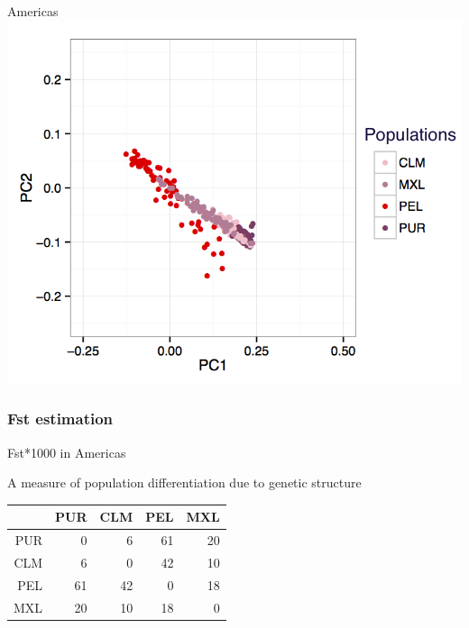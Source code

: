\documentclass[11pt,xcolor=table]{beamer}
\begin{document}
\begin{frame}{Americas}
\centering
\includegraphics[width=.85\textwidth]{pics/pel-AMR.png}
\end{frame}

\subsubsection{Fst estimation}
\begin{frame}{Fst*1000 in Americas}
\begin{block}{A measure of population differentiation due to genetic structure}
\end{block}
\begin{table}[]
\centering
\begin{tabular}{|r||r|r|r|r|}
\hline
    &PUR    &    CLM    &    PEL&        MXL \\ \hline
PUR&      0   &  6    &61  &  20 \\ \hline
CLM &     6  &   0    &42  &  10 \\ \hline
PEL  &   61 &   42    & 0 &   18 \\ \hline
MXL   &  20&    10    &18&     0 \\ \hline
\end{tabular}
\end{table}
\end{frame}
\end{document}

